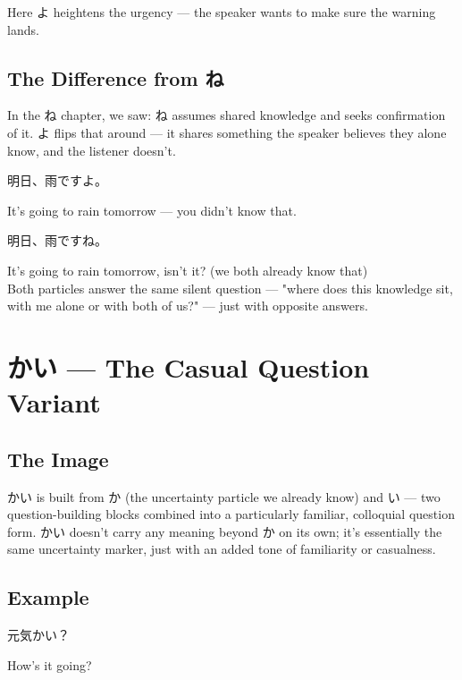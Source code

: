 \documentclass[12pt]{book}
\begin{document}
Here よ heightens the urgency — the speaker wants to make sure the warning lands.

\section*{The Difference from ね}

In the ね chapter, we saw: ね assumes shared knowledge and seeks confirmation of it. よ flips that around — it shares something the speaker believes they alone know, and the listener doesn't.

\par\quad 明日、雨ですよ。\\
\par\quad It's going to rain tomorrow — you didn't know that.\\

\par\quad 明日、雨ですね。\\
\par\quad It's going to rain tomorrow, isn't it? (we both already know that)\\

Both particles answer the same silent question — "where does this knowledge sit, with me alone or with both of us?" — just with opposite answers.


\chapter{かい — The Casual Question Variant}

\section*{The Image}

かい is built from か (the uncertainty particle we already know) and い — two question-building blocks combined into a particularly familiar, colloquial question form. かい doesn't carry any meaning beyond か on its own; it's essentially the same uncertainty marker, just with an added tone of familiarity or casualness.

\section*{Example}

\par\quad 元気かい？\\
\par\quad How's it going?\\
\end{document}
